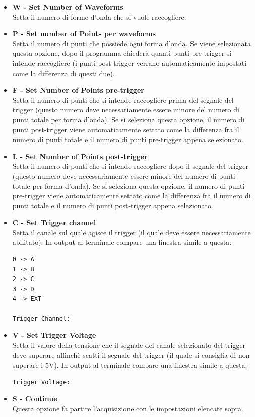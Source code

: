 \documentclass[a4paper]{article}
\begin{document}
\begin{itemize}
\item \textbf{W - Set Number of Waveforms}\\
Setta il numero di forme d'onda che si vuole raccogliere.
\item \textbf{P - Set number of Points per waveforms}\\
Setta il numero di punti che possiede ogni forma d'onda. Se viene selezionata questa opzione, dopo il programma chiederà quanti punti pre-trigger si intende raccogliere (i punti post-trigger verrano automaticamente impostati come la differenza di questi due).
\item \textbf{F - Set Number of Points pre-trigger}\\
Setta il numero di punti che si intende raccogliere prima del segnale del trigger (questo numero deve necessariamente essere minore del numero di punti totale per forma d'onda). Se si seleziona questa opzione, il numero di punti post-trigger viene automaticamente settato come la differenza fra il numero di punti totale e il numero di punti pre-trigger appena selezionato.
\item \textbf{L - Set Number of Points post-trigger}\\
Setta il numero di punti che si intende raccogliere dopo il segnale del trigger (questo numero deve necessariamente essere minore del numero di punti totale per forma d'onda). Se si seleziona questa opzione, il numero di punti pre-trigger viene automaticamente settato come la differenza fra il numero di punti totale e il numero di punti post-trigger appena selezionato.
\item \textbf{C - Set Trigger channel}\\
Setta il canale sul quale agisce il trigger (il quale deve essere necessariamente abilitato). In output al terminale compare una finestra simile a questa:
\begin{tcolorbox}
\begin{Verbatim}[tabsize = 4]
0 -> A
1 -> B
2 -> C
3 -> D
4 -> EXT

Trigger Channel:
\end{Verbatim}
\end{tcolorbox}
\item \textbf{V - Set Trigger Voltage}\\
Setta il valore della tensione che il segnale del canale selezionato del trigger deve superare affinchè scatti il segnale del trigger (il quale si consiglia di non superare i 5V). In output al terminale compare una finestra simile a questa:
\begin{tcolorbox}
\begin{Verbatim}[tabsize = 4]
Trigger Voltage:
\end{Verbatim}
\end{tcolorbox}
\item \textbf{S - Continue}\\
Questa opzione fa partire l'acquisizione con le impostazioni elencate sopra.
\end{itemize}
\end{document}
